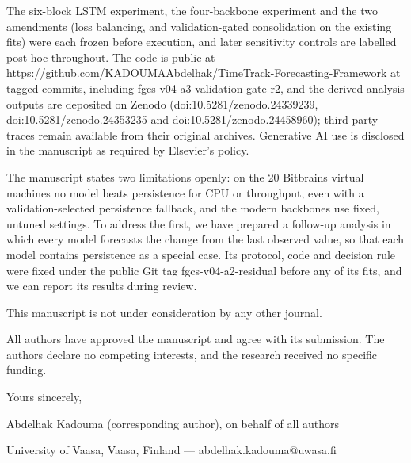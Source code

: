 \documentclass[11pt,a4paper]{article}
\begin{document}
The six-block LSTM experiment, the four-backbone experiment and the two amendments (loss balancing, and validation-gated consolidation on the existing fits) were each frozen before execution, and later sensitivity controls are labelled post hoc throughout. The code is public at \url{https://github.com/KADOUMAAbdelhak/TimeTrack-Forecasting-Framework} at tagged commits, including fgcs-v04-a3-validation-gate-r2, and the derived analysis outputs are deposited on Zenodo (doi:10.5281/zenodo.24339239, doi:10.5281/zenodo.24353235 and doi:10.5281/zenodo.24458960); third-party traces remain available from their original archives. Generative AI use is disclosed in the manuscript as required by Elsevier's policy.

The manuscript states two limitations openly: on the 20 Bitbrains virtual machines no model beats persistence for CPU or throughput, even with a validation-selected persistence fallback, and the modern backbones use fixed, untuned settings. To address the first, we have prepared a follow-up analysis in which every model forecasts the change from the last observed value, so that each model contains persistence as a special case. Its protocol, code and decision rule were fixed under the public Git tag fgcs-v04-a2-residual before any of its fits, and we can report its results during review.

This manuscript is not under consideration by any other journal.

All authors have approved the manuscript and agree with its submission. The authors declare no competing interests, and the research received no specific funding.

Yours sincerely,

Abdelhak Kadouma (corresponding author), on behalf of all authors

University of Vaasa, Vaasa, Finland --- abdelhak.kadouma@uwasa.fi
\end{document}
